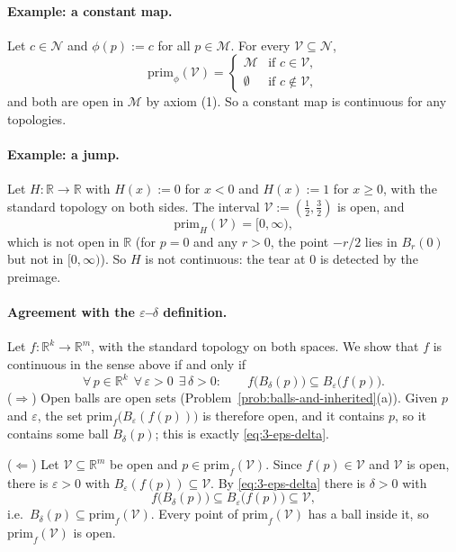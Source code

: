 \documentclass[11pt]{article}
\newcommand{\prim}[1]{\mathrm{prim}_{#1}}
\begin{document}
\paragraph{Example: a constant map.} Let $c\in\mathcal N$ and $\phi(p):=c$ for all $p\in\mathcal M$. For every $\mathcal V\subseteq\mathcal N$,
\[
\prim{\phi}(\mathcal V)=
\begin{cases}
\mathcal M & \text{if } c\in\mathcal V,\\
\emptyset & \text{if } c\notin\mathcal V,
\end{cases}
\]
and both are open in $\mathcal M$ by axiom (1). So a constant map is continuous for any topologies.

\paragraph{Example: a jump.} Let $H:\mathbb R\to\mathbb R$ with $H(x):=0$ for $x<0$ and $H(x):=1$ for $x\ge0$, with the standard topology on both sides. The interval $\mathcal V:=(\tfrac12,\tfrac32)$ is open, and
\[
\prim{H}(\mathcal V)=[0,\infty),
\]
which is not open in $\mathbb R$ (for $p=0$ and any $r>0$, the point $-r/2$ lies in $B_r(0)$ but not in $[0,\infty)$). So $H$ is not continuous: the tear at $0$ is detected by the preimage.

\paragraph{Agreement with the $\varepsilon$--$\delta$ definition.}
Let $f:\mathbb R^k\to\mathbb R^m$, with the standard topology on both spaces. We show that $f$ is continuous in the sense above if and only if
\[
\forall\,p\in\mathbb R^k\ \ \forall\,\varepsilon>0\ \ \exists\,\delta>0:\qquad f\big(B_\delta(p)\big)\subseteq B_\varepsilon\big(f(p)\big).\tag{3.1}\label{eq:3-eps-delta}
\]
($\Rightarrow$) Open balls are open sets (Problem~\ref{prob:balls-and-inherited}(a)). Given $p$ and $\varepsilon$, the set $\prim{f}\big(B_\varepsilon(f(p))\big)$ is therefore open, and it contains $p$, so it contains some ball $B_\delta(p)$; this is exactly \eqref{eq:3-eps-delta}.

($\Leftarrow$) Let $\mathcal V\subseteq\mathbb R^m$ be open and $p\in\prim{f}(\mathcal V)$. Since $f(p)\in\mathcal V$ and $\mathcal V$ is open, there is $\varepsilon>0$ with $B_\varepsilon(f(p))\subseteq\mathcal V$. By \eqref{eq:3-eps-delta} there is $\delta>0$ with
\[
f\big(B_\delta(p)\big)\subseteq B_\varepsilon\big(f(p)\big)\subseteq\mathcal V,
\]
i.e.\ $B_\delta(p)\subseteq\prim{f}(\mathcal V)$. Every point of $\prim{f}(\mathcal V)$ has a ball inside it, so $\prim{f}(\mathcal V)$ is open.
\end{document}
